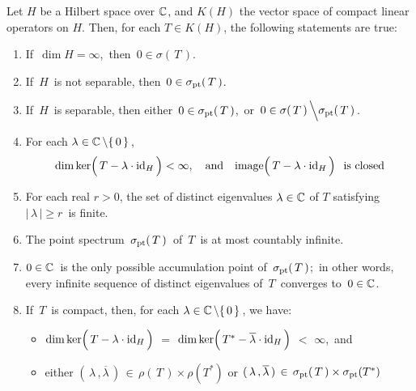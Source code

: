 \vskip 0.5cm
\begin{theorem}\mbox{}
\vskip 0.1cm
\noindent
Let $H$ be a Hilbert space over $\mathbb{C}$, and $K(H)$ the vector space of compact linear operators on $H$.
Then, for each $T \in K(H)$, the following statements are true:
\begin{enumerate}
\item
	If \,$\dim H = \infty$,\, then \,$0 \in \sigma(\,T\,)$.
\item
	If \,$H$\, is not separable, then \,$0 \in \sigma_{\textnormal{pt}}(\,T\,)$.
\item
	If \,$H$\, is separable, then either \,$0 \in \sigma_{\textnormal{pt}}(\,T\,)$,\, or
	\,$0 \in \sigma(\,T\,) \left\backslash \sigma_{\textnormal{pt}}(\,\overset{{\color{white}.}}{T}\,)\right.$.
\item
	For each $\lambda \in \mathbb{C} \left\backslash\{\,0\,\}\right.$,
	\begin{equation*}
	\dim\ker\!\left(\,T \overset{{\color{white}.}}{-} \lambda\cdot\textnormal{id}_{H}\,\right) < \infty,
	\quad\textnormal{and}\quad
	\image\!\left(\,T \overset{{\color{white}.}}{-} \lambda\cdot\textnormal{id}_{H}\,\right)\;\;\textnormal{is closed}
	\end{equation*}
\item
	For each real $r > 0$, the set of distinct eigenvalues $\lambda \in \mathbb{C}$ of $T$
	satisfying \,$\vert\,\lambda\,\vert \geq r$\, is finite.
\item
	The point spectrum \,$\sigma_{\textnormal{pt}}(\,T\,)$\, of $\,T$\, is at most countably infinite.
\item
	$0 \in \mathbb{C}$\, is the only possible accumulation point of \,$\sigma_{\textnormal{pt}}(\,T\,)$;\,
	in other words, every infinite sequence of distinct eigenvalues of \,$T$\, converges to \,$0 \in \mathbb{C}$.
\item
	If \,$T$\, is compact, then, for each $\lambda \in \mathbb{C} \left\backslash\{\,0\,\}\right.$, we have:
	\begin{itemize}
	\item
		$\dim\ker\!\left(\,T \overset{{\color{white}.}}{-} \lambda\cdot\textnormal{id}_{H}\,\right)$
		$=$
		$\dim\ker\!\left(\,T^{*} \overset{{\color{white}.}}{-} \overline{\lambda}\cdot\textnormal{id}_{H}\,\right)$
		$<$ $\infty$,\, and
	\item
		either\;\;
		$(\,\lambda\,, \overline{\lambda}\,) \,\in\, \rho(\,T\,) \times \rho(T^{*})$
		\;\; or \;\;
		$(\,\lambda\,, \overline{\lambda}\,) \,\in\, \sigma_{\textnormal{pt}}(\,T\,) \times \sigma_{\textnormal{pt}}(T^{*})$
	\end{itemize}
\end{enumerate}
\end{theorem}

